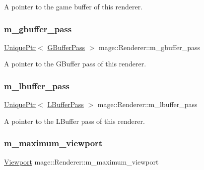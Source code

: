 A pointer to the game buffer of this renderer. \hypertarget{classmage_1_1_renderer_a7f36e74990c2c32d7fa26cdc00f86009}{}\label{classmage_1_1_renderer_a7f36e74990c2c32d7fa26cdc00f86009} 
\subsubsection{\texorpdfstring{m\+\_\+gbuffer\+\_\+pass}{m\_gbuffer\_pass}}
{\footnotesize\ttfamily \hyperlink{namespacemage_a3316d7143a973e37adf1110f2e80ca31}{Unique\+Ptr}$<$ \hyperlink{classmage_1_1_g_buffer_pass}{G\+Buffer\+Pass} $>$ mage\+::\+Renderer\+::m\+\_\+gbuffer\+\_\+pass\hspace{0.3cm}{\ttfamily [private]}}

A pointer to the G\+Buffer pass of this renderer. \hypertarget{classmage_1_1_renderer_a7f60c763f2636bd1ea608b69a5924996}{}\label{classmage_1_1_renderer_a7f60c763f2636bd1ea608b69a5924996} 
\subsubsection{\texorpdfstring{m\+\_\+lbuffer\+\_\+pass}{m\_lbuffer\_pass}}
{\footnotesize\ttfamily \hyperlink{namespacemage_a3316d7143a973e37adf1110f2e80ca31}{Unique\+Ptr}$<$ \hyperlink{structmage_1_1_l_buffer_pass}{L\+Buffer\+Pass} $>$ mage\+::\+Renderer\+::m\+\_\+lbuffer\+\_\+pass\hspace{0.3cm}{\ttfamily [private]}}

A pointer to the L\+Buffer pass of this renderer. \hypertarget{classmage_1_1_renderer_a4a874bbe3cd4f19a16a65cca7bb93100}{}\label{classmage_1_1_renderer_a4a874bbe3cd4f19a16a65cca7bb93100} 
\subsubsection{\texorpdfstring{m\+\_\+maximum\+\_\+viewport}{m\_maximum\_viewport}}
{\footnotesize\ttfamily \hyperlink{classmage_1_1_viewport}{Viewport} mage\+::\+Renderer\+::m\+\_\+maximum\+\_\+viewport\hspace{0.3cm}{\ttfamily [private]}}

